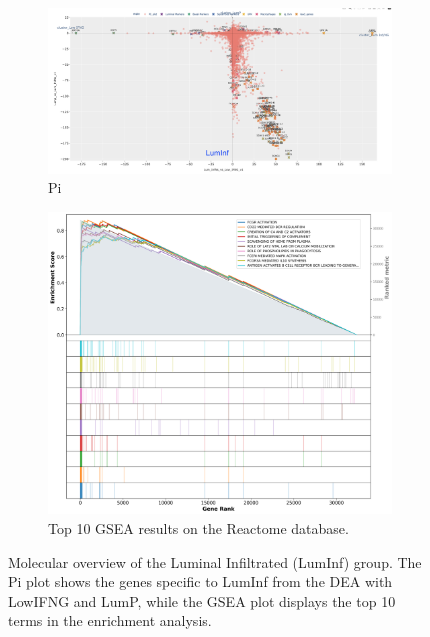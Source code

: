 \begin{figure}[H]
    \centering
    \begin{subfigure}[!t]{1.0\textwidth}
        \includegraphics[width=\textwidth,keepaspectratio]{Sections/ClusteringAnalysis/Resources/discussion/other_groups/lumInf_pi.png}    
        \caption{Pi}
        \label{fig:cs:lumInf_pi}
    \end{subfigure}
    \centering
    \begin{subfigure}[!t]{0.8\textwidth}
        \includegraphics[width=\textwidth, keepaspectratio]{Sections/ClusteringAnalysis/Resources/discussion/other_groups/lumInf_reactome_10_top.png}
        \caption{Top 10 GSEA results on the Reactome database.}
        \label{fig:cs:lumInf_gsea}
    \end{subfigure} 
    \centering
    \caption{Molecular overview of the Luminal Infiltrated (LumInf) group. The Pi plot shows the genes specific to LumInf from the DEA with LowIFNG and LumP, while the GSEA plot displays the top 10 terms in the enrichment analysis.} 
    \label{fig:cs:lumInf}
\end{figure}



